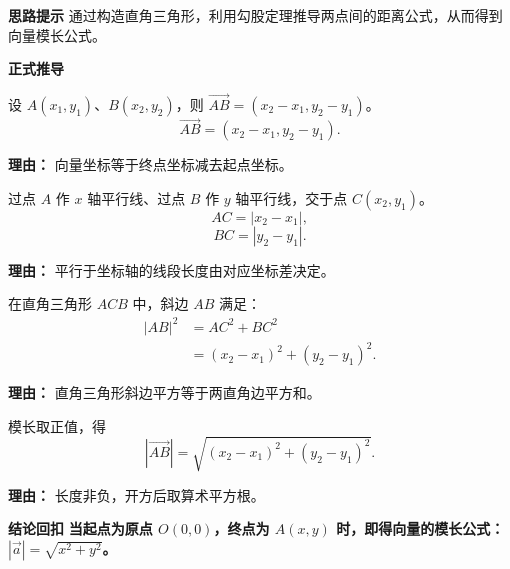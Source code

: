 \begin{proofbox}
	\textbf{\textcolor{CProof}{思路提示}}
	通过构造直角三角形，利用勾股定理推导两点间的距离公式，从而得到向量模长公式。

	\medskip
	\textbf{\textcolor{CProof}{正式推导}}
	\begin{description}[style=nextline, leftmargin=2.8em, labelsep=0.5em, itemsep=0.55em]
		\item[\textbf{步骤一（向量坐标差）：}]
			设 $A(x_1,y_1)$、$B(x_2,y_2)$，则 $\overrightarrow{AB}=(x_2-x_1,y_2-y_1)$。
			\[
				\overrightarrow{AB} = (x_2-x_1, y_2-y_1).
			\]
			\par\textbf{理由：} 向量坐标等于终点坐标减去起点坐标。
		\item[\textbf{步骤二（直角边长度）：}]
			过点 $A$ 作 $x$ 轴平行线、过点 $B$ 作 $y$ 轴平行线，交于点 $C(x_2,y_1)$。
			\[
				AC = |x_2-x_1|,
			\]
			\[
				BC = |y_2-y_1|.
			\]
			\par\textbf{理由：} 平行于坐标轴的线段长度由对应坐标差决定。
		\item[\textbf{步骤三（勾股定理）：}]
			在直角三角形 $ACB$ 中，斜边 $AB$ 满足：
			\[
				\begin{aligned}
					|AB|^2 &= AC^2 + BC^2 \\ &= (x_2-x_1)^2 + (y_2-y_1)^2.
			\end{aligned}
			\]
			\par\textbf{理由：} 直角三角形斜边平方等于两直角边平方和。
		\item[\textbf{步骤四（算术平方根）：}]
			模长取正值，得
			\[
				|\overrightarrow{AB}| = \sqrt{(x_2-x_1)^2 + (y_2-y_1)^2}.
			\]
			\par\textbf{理由：} 长度非负，开方后取算术平方根。
	\end{description}

	\medskip
	\textbf{\textcolor{CProof}{结论回扣}}
	\textbf{当起点为原点 $O(0,0)$，终点为 $A(x,y)$ 时，即得向量的模长公式：$|\vec{a}| = \sqrt{x^2+y^2}$。}
\end{proofbox}
